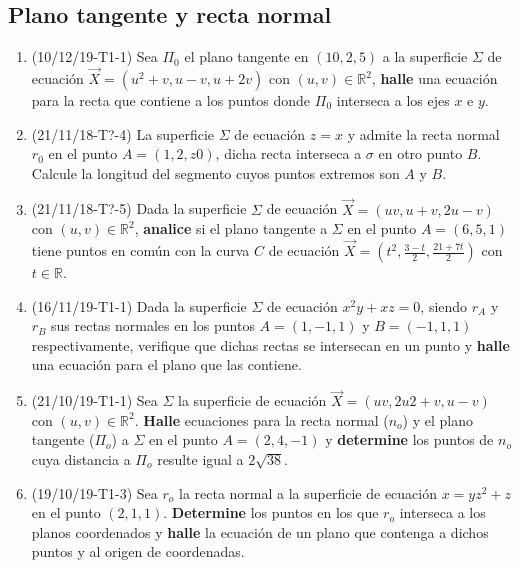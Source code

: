 \documentclass[12pt,a4paper]{article}
\renewcommand{\b}[1]{\textbf{#1}}
\newcommand{\R}{\mathbb{R}}
\begin{document}
\subsection{Plano tangente y recta normal}
\begin{enumerate}
	\item (10/12/19-T1-1) Sea $\Pi_0$ el plano tangente en $( 10, 2, 5 )$ a la superficie $\Sigma$ de ecuación $\vec{X}= ( u^2 + v, u - v, u + 2 v )$ con $( u, v ) \in \R^2$, \b{halle} una ecuación para la recta que contiene a los puntos donde $\Pi_0$ interseca a los ejes $x$ e $y$.
	
	\item (21/11/18-T?-4) La superficie $ \Sigma $ de ecuación $  z = x  $ y admite la recta normal $ r_0  $ en el punto $ A = ( 1, 2, z 0 ) $, dicha recta interseca a $ \sigma $ en otro punto $ B $. Calcule la longitud del segmento cuyos puntos extremos son $ A $ y $ B $.
	
	\item (21/11/18-T?-5) Dada la superficie $ \Sigma $ de ecuación $ \vec{X} = ( u v, u + v, 2 u - v ) $ con $ ( u, v )\in\R^2$, \b{analice} si el plano tangente a $ \Sigma $ en el punto $ A = ( 6, 5, 1 ) $ tiene puntos en común con la curva $ C $ de ecuación $\vec{X}=\left(t^2, \frac{3 - t}{2}, \frac{21 + 7 t}{2} \right)$ con $ t \in\R $.
	
	\item (16/11/19-T1-1) Dada la superficie $ \Sigma $ de ecuación $ x^2 y + x z = 0 $, siendo $ r_A $ y $ r_B $ sus rectas normales en los puntos $ A = ( 1, - 1, 1 ) $ y $ B = (- 1, 1, 1 ) $ respectivamente, verifique que dichas rectas se intersecan en un punto y \b{halle} una ecuación para el plano que las contiene.
	
	\item (21/10/19-T1-1) Sea $ \Sigma $ la superficie de ecuación $ \vec{X} = ( u v, 2 u 2 + v, u - v ) $ con $( u, v )\in\R^2 $. \b{Halle} ecuaciones para la recta normal ($n_o$) y el plano tangente ($\Pi_o$) a $ \Sigma $ en el punto $ A = ( 2, 4, - 1 ) $ y \b{determine} los puntos de	$ n_o $ cuya distancia a $ \Pi_o $ resulte igual a $ 2 \sqrt{38}  $.
	
	\item (19/10/19-T1-3) Sea $ r_o $ la recta normal a la superficie de ecuación $ x = y z^2 + z $ en el punto $ ( 2, 1, 1 )  $. \b{Determine} los puntos en los que $ r_o $ interseca a los planos coordenados y \b{halle} la ecuación de un plano que contenga a dichos puntos y al origen de coordenadas.
	

\end{enumerate}
\end{document}
